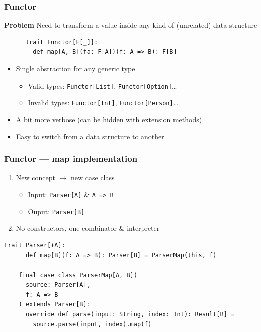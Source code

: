 \begin{frame}[fragile]
  \frametitle{Functor}

  \textbf{Problem} Need to transform a value inside any kind of (unrelated) data structure

  \begin{definition}[Functor]
    \begin{lstlisting}
      trait Functor[F[_]]:
        def map[A, B](fa: F[A])(f: A => B): F[B]
    \end{lstlisting}
  \end{definition}

  \begin{itemize}
    \item Single abstraction for any \ul{generic} type
          \begin{itemize}
            \item Valid types: \texttt{Functor[List]}, \texttt{Functor[Option]}\dots
            \item Invalid types: \texttt{Functor[Int]}, \texttt{Functor[Person]}\dots
          \end{itemize}
    \item A bit more verbose (can be hidden with extension methods)
    \item Easy to switch from a data structure to another
  \end{itemize}
\end{frame}

\begin{frame}[fragile]
  \frametitle{Functor --- map implementation}

  \begin{enumerate}
    \item New concept \({\rightarrow}\) new case class
          \begin{itemize}
            \item Input: \texttt{Parser[A]} \& \texttt{A => B}
            \item Ouput: \texttt{Parser[B]}
          \end{itemize}
    \item No constructors, one combinator \& interpreter
  \end{enumerate}


  \begin{lstlisting}[gobble=4]
    trait Parser[+A]:
      def map[B](f: A => B): Parser[B] = ParserMap(this, f)

    final case class ParserMap[A, B](
      source: Parser[A],
      f: A => B
    ) extends Parser[B]:
      override def parse(input: String, index: Int): Result[B] =
        source.parse(input, index).map(f)
  \end{lstlisting}
\end{frame}

